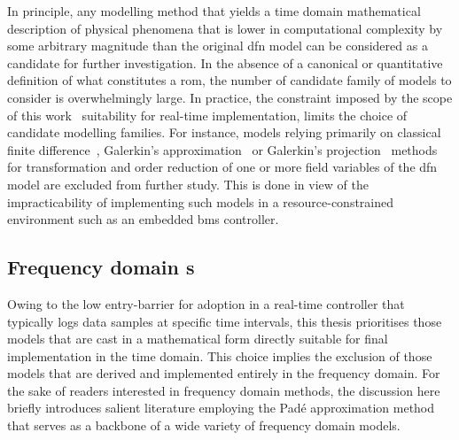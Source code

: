 In  principle, any  modelling  method  that yields  a  time domain  mathematical
description  of physical  phenomena that  is lower  in computational  complexity
by  some  arbitrary   magnitude  than  the  original  \gls{dfn}   model  can  be
considered  as  a  candidate  for  further  investigation.  In  the  absence  of
a  canonical  or  quantitative  definition  of  what  constitutes  a  \gls{rom},
the  number  of  candidate  family  of  models  to  consider  is  overwhelmingly
large.  In  practice,  the  constraint  imposed   by  the  scope  of  this  work
\ie~suitability  for real-time  implementation, limits  the choice  of candidate
modelling  families.  For  instance,   models  relying  primarily  on  classical
finite  difference~\cite{Smith2006}, Galerkin's  approximation~\cite{Dao2012} or
Galerkin's  projection~\cite{Fan2016,Fan2018}  methods  for  transformation  and
order  reduction of  one or  more  field variables  of the  \gls{dfn} model  are
excluded from  further study. This  is done in  view of the  impracticability of
implementing  such  models in  a  resource-constrained  environment such  as  an
embedded \gls{bms} controller.

\subsection{Frequency   domain   s}\label{subsec:freqdomainroms}

Owing  to the  low entry-barrier  for adoption  in a  real-time controller  that
typically logs data samples at  specific time intervals, this thesis prioritises
those models  that are cast in  a mathematical form directly  suitable for final
implementation in  the time domain. This  choice implies the exclusion  of those
models that  are derived and implemented  entirely in the frequency  domain. For
the sake of readers interested in  frequency domain methods, the discussion here
briefly introduces  salient literature  employing the Padé  approximation method
that serves as a backbone of a wide variety of frequency domain models.


